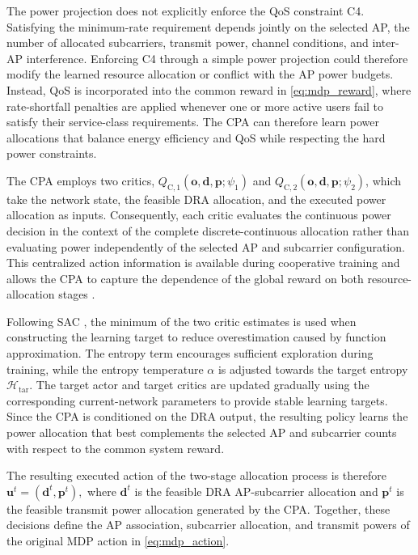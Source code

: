 \documentclass[journal]{IEEEtran}
\begin{document}
The power projection does not explicitly enforce the QoS constraint
C4. Satisfying the minimum-rate requirement depends jointly on the
selected AP, the number of allocated subcarriers, transmit power,
channel conditions, and inter-AP interference. Enforcing C4 through
a simple power projection could therefore modify the learned resource
allocation or conflict with the AP power budgets. Instead, QoS is
incorporated into the common reward in \eqref{eq:mdp_reward}, where
rate-shortfall penalties are applied whenever one or more active
users fail to satisfy their service-class requirements. The CPA can
therefore learn power allocations that balance energy efficiency
and QoS while respecting the hard power constraints.

The CPA employs two critics,
$Q_{\mathrm{C},1}(\mathbf{o},\mathbf{d},\mathbf{p};\psi_{1})$ and
$Q_{\mathrm{C},2}(\mathbf{o},\mathbf{d},\mathbf{p};\psi_{2})$, which
take the network state, the feasible DRA allocation, and the executed
power allocation as inputs. Consequently, each critic evaluates the
continuous power decision in the context of the complete
discrete-continuous allocation rather than evaluating power
independently of the selected AP and subcarrier configuration. This
centralized action information is available during cooperative
training and allows the CPA to capture the dependence of the global
reward on both resource-allocation stages \cite{Lowe2017MADDPG}.

Following SAC \cite{Haarnoja2018SAC}, the minimum of the two critic
estimates is used when constructing the learning target to reduce
overestimation caused by function approximation. The entropy term
encourages sufficient exploration during training, while the entropy
temperature $\alpha$ is adjusted towards the target entropy
$\mathcal{H}_{\mathrm{tar}}$. The target actor and target critics are updated gradually
using the corresponding current-network parameters
to provide stable learning targets. Since the CPA is conditioned on
the DRA output, the resulting policy learns the power allocation that
best complements the selected AP and subcarrier counts
with respect to the common system reward.

The resulting executed action of the two-stage allocation process is
therefore $\mathbf{u}^{t} =\left(\mathbf{d}^{t},\mathbf{p}^{t}\right),$ where $\mathbf{d}^{t}$ is the feasible DRA AP-subcarrier allocation and $\mathbf{p}^{t}$ is the feasible transmit
power allocation generated by the CPA. Together, these decisions
define the AP association, subcarrier allocation, and transmit powers
of the original MDP action in \eqref{eq:mdp_action}.
\end{document}
